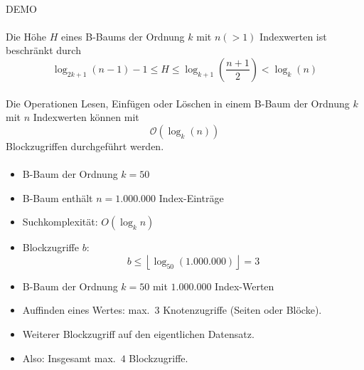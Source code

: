 \begin{frame}{\insertsection}
\framesubtitle{\insertsubsection}
\begin{center}
	{\Huge DEMO}
\end{center}
\end{frame}

\begin{frame}{\insertsection}
\framesubtitle{\insertsubsection}
\abs
\begin{theorem}
Die H\"ohe $H$ eines B-Baums der Ordnung $k$ mit $n (>1)$ Indexwerten ist beschr\"ankt durch
\begin{equation*}
\log_{2k+1}(n-1) - 1 \le H \le \log_{k+1}\left(\frac{n+1}{2}\right) < \log_k(n)
\end{equation*}
\end{theorem}
\end{frame}

\begin{frame}{\insertsection}
\framesubtitle{\insertsubsection}
\abs
\begin{theorem}[Laufzeitverhalten]
Die Operationen Lesen, Einf\"ugen oder L\"oschen in einem B-Baum der Ordnung $k$ mit $n$ Indexwerten k\"onnen mit 
\begin{equation*}
\mathcal{O}\left(\log_{k}(n)\right)
\end{equation*}
Blockzugriffen durchgef\"uhrt werden.
\end{theorem}
\end{frame}

\begin{frame}{\insertsection}
\framesubtitle{\insertsubsection}
\begin{itemize}
\item B-Baum der Ordnung $k=50$
\item B-Baum enth\"alt $n=1.000.000$ Index-Einträge 
\item Suchkomplexität: $O(\log_{k}n)$
\item Blockzugriffe $b$: 
$$b\le\left\lfloor\log_{50}(1.000.000)\right\rfloor=3$$	
\end{itemize}
\abs\pause
\begin{itemize}
\item B-Baum der Ordnung $k=50$ mit $1.000.000$ Index-Werten
\item Auffinden eines Wertes: max.~$3$ Knotenzugriffe (Seiten oder Bl\"ocke).
\item Weiterer Blockzugriff auf den eigentlichen Datensatz. 
\item Also: Insgesamt max.~$4$ Blockzugriffe.
\end{itemize} 
\end{frame}


